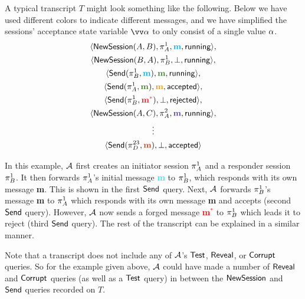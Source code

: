 \begin{example}
A typical transcript $T$ might look something like the following.
Below we have used different colors to indicate different messages,
and we have simplified the sessions' acceptance state variable $\vrunstate$ to only consist of a single value $\alpha$.
\begin{gather*}
	\langle \NewSession(A, B),\oracle[A][1], \textcolor{Cyan}{\mathbf{m}}, \running \rangle, \\
	\langle \NewSession(B,A),\oracle[B][1], \bot, \running \rangle, \\
	\langle \Send(\oracle[B][1], \textcolor{Cyan}{\mathbf{m}}), \textcolor{OliveGreen}{\mathbf{m}}, \running \rangle, \\
	\langle \Send(\oracle[A][1], \textcolor{OliveGreen}{\mathbf{m}}), \textcolor{YellowOrange}{\mathbf{m}}, \accepted \rangle, \\
	\langle \Send(\oracle[B][1], \textcolor{Red}{\mathbf{m}^*}), \bot, \rejected \rangle, \\
	\langle \NewSession(A, C),\oracle[A][2], \textcolor{Violet}{\mathbf{m}}, \running \rangle, \\
								\vdots \\
	\langle \Send(\oracle[D][23], \textcolor{Bittersweet}{\mathbf{m}}), \bot, \accepted \rangle
\end{gather*}

In this example, $\mathcal{A}$ first creates an initiator session $\oracle[A][1]$ and a responder session $\oracle[B][1]$.
It then forwards $\oracle[A][1]$'s initial message \textcolor{Cyan}{\textbf{m}} to $\oracle[B][1]$,
which responds with its own message \textcolor{OliveGreen}{\textbf{m}}.
This is shown in the first $\mathsf{Send}$ query.
Next,
$\mathcal{A}$ forwards $\oracle[B][1]$'s message \textcolor{OliveGreen}{\textbf{m}} to $\oracle[A][1]$ which responds with its own message \textcolor{YellowOrange}{\textbf{m}} and accepts (second $\mathsf{Send}$ query).
However,
$\mathcal{A}$ now sends a forged message \textcolor{Red}{\textbf{m}$^*$} to $\oracle[B][1]$ which leads it to reject (third $\mathsf{Send}$ query).
The rest of the transcript can be explained in a similar manner.
\end{example}

Note that a transcript does not include any of $\mathcal{A}$'s $\mathsf{Test}$, $\mathsf{Reveal}$, or $\mathsf{Corrupt}$ queries.
So for the example given above, 
$\mathcal{A}$ could have made a number of $\mathsf{Reveal}$ and $\mathsf{Corrupt}$ queries (as well as a $\mathsf{Test}$ query) in between the $\mathsf{NewSession}$ and $\mathsf{Send}$ queries recorded on $T$.

